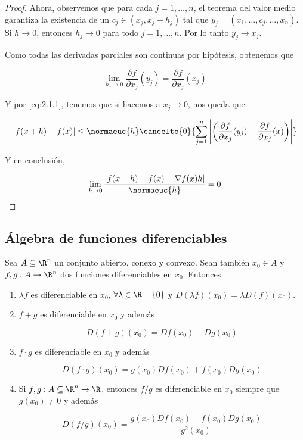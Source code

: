 \begin{proof}
    Ahora, observemos que para cada $j = 1, \dots, n$, el teorema del valor medio garantiza la existencia de un $c_j \in (x_j, x_j + h_j)$ tal que $y_j = (x_1, \dots, c_j, \dots, x_n)$. Si $h \to 0$, entonces $h_j \to 0$ para todo $j = 1, \dots, n$. Por lo tanto $y_j \to x_j$.
    
    Como todas las derivadas parciales son continuas por hipótesis, obtenemos que
    
    \[
    \lim_{h_j \to 0} \frac{\partial f}{\partial x_j} (y_j) = \frac{\partial f}{\partial x_j} (x_j)
    \]
    
    Y por \ref{eq:2.1.1}, tenemos que si hacemos a $x_j \to 0$, nos queda que
    
    \[
    \left| f(x + h) - f(x) \right| \leq \normaeuc{h} \cancelto{0}{\sum_{j=1}^n \Bigg| \bigg( \frac{\partial f}{\partial x_j} (y_j) - \frac{\partial f}{\partial x_j} (x) \bigg) \Bigg|}
    \]
    
    Y en conclusión,
    
    \[
    \lim_{h \to 0} \frac{\left| f(x + h) - f(x) - \nabla f(x) h \right|}{\normaeuc{h}} = 0
    \]
\end{proof}

\subsection{Álgebra de funciones diferenciables}

\begin{teo}
    Sea $A \subseteq \R^n$ un conjunto abierto, conexo y convexo. Sean también $x_0 \in A$ y $f, g: A \rightarrow \R^n$ dos funciones diferenciables en $x_0$. Entonces
    
    \begin{enumerate}
        \item $\lambda f$ es diferenciable en $x_0$, $\forall \lambda \in \R - \{0\}$ y $D(\lambda f) (x_0) = \lambda D(f) (x_0)$.
        \item $f + g$ es diferenciable en $x_0$ y además
        
        \[
        D(f + g)(x_0) = D f(x_0) + D g(x_0)
        \]
        \item $f \cdot g$ es diferenciable en $x_0$ y además
        
        \[
        D(f \cdot g)(x_0) = g(x_0)Df(x_0) + f(x_0)Dg(x_0)
        \]
        
        \item Si $f,g : A \subseteq \R^n \rightarrow \R$, entonces $f / g$ es diferenciable en $x_0$ siempre que $g(x_0) \neq 0$ y además
        
        \[
        D(f/g) (x_0) = \dfrac{g(x_0)Df(x_0) - f(x_0)Dg(x_0)}{g^2(x_0)}
        \]
    \end{enumerate}
\end{teo}

